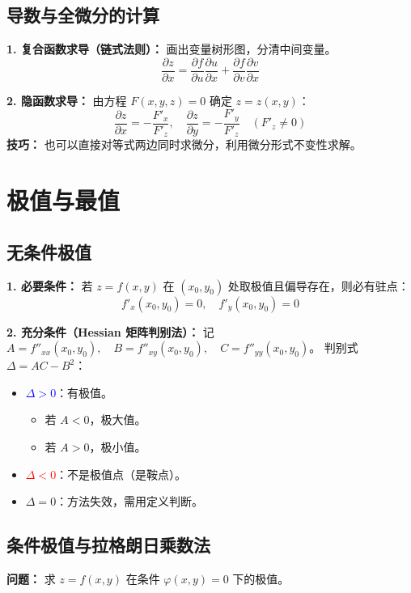 \documentclass[a4paper,12pt]{ctexart}
\begin{document}
\subsection{导数与全微分的计算}

\textbf{1. 复合函数求导（链式法则）：}
画出变量树形图，分清中间变量。
\[ \frac{\partial z}{\partial x} = \frac{\partial f}{\partial u}\frac{\partial u}{\partial x} + \frac{\partial f}{\partial v}\frac{\partial v}{\partial x} \]

\textbf{2. 隐函数求导：}
由方程 $F(x,y,z)=0$ 确定 $z=z(x,y)$：
\[ \frac{\partial z}{\partial x} = -\frac{F'_x}{F'_z}, \quad \frac{\partial z}{\partial y} = -\frac{F'_y}{F'_z} \quad (F'_z \neq 0) \]
\textbf{技巧：} 也可以直接对等式两边同时求微分，利用微分形式不变性求解。

\section{极值与最值}

\subsection{无条件极值}

\textbf{1. 必要条件：}
若 $z=f(x,y)$ 在 $(x_0,y_0)$ 处取极值且偏导存在，则必有驻点：
\[ f'_x(x_0,y_0) = 0, \quad f'_y(x_0,y_0) = 0 \]

\textbf{2. 充分条件（Hessian 矩阵判别法）：}
记 $A = f''_{xx}(x_0,y_0), \quad B = f''_{xy}(x_0,y_0), \quad C = f''_{yy}(x_0,y_0)$。
判别式 $\Delta = AC - B^2$：
\begin{itemize}
    \item \textcolor{blue}{$\Delta > 0$}：有极值。
    \begin{itemize}
        \item 若 $A < 0$，极大值。
        \item 若 $A > 0$，极小值。
    \end{itemize}
    \item \textcolor{red}{$\Delta < 0$}：不是极值点（是鞍点）。
    \item $\Delta = 0$：方法失效，需用定义判断。
\end{itemize}

\subsection{条件极值与拉格朗日乘数法}

\textbf{问题：} 求 $z=f(x,y)$ 在条件 $\varphi(x,y)=0$ 下的极值。
\end{document}
